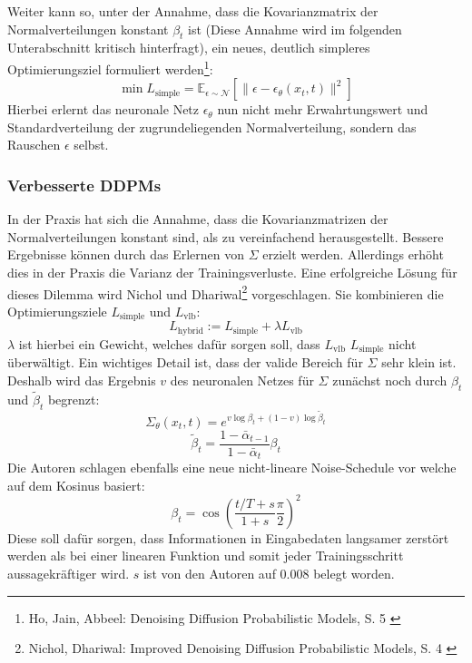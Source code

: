 Weiter kann so, unter der Annahme, dass die Kovarianzmatrix der Normalverteilungen konstant $\beta_t$ ist (Diese Annahme wird im folgenden Unterabschnitt kritisch hinterfragt), ein neues, deutlich simpleres Optimierungsziel formuliert werden\footnote{
    Ho, Jain, Abbeel: Denoising Diffusion Probabilistic Models, S. 5
    \cite{ho2020denoisingdiffusionprobabilisticmodels}
}: 
\begin{equation}
    \min L_\text{simple} = \mathbb E_{\epsilon \sim \mathcal N}
    \left [
        \| \epsilon - \epsilon_\theta(x_{t}, t) \|^2
    \right ]
\end{equation}
Hierbei erlernt das neuronale Netz $\epsilon_\theta$ nun nicht mehr Erwahrtungswert und Standardverteilung der zugrundeliegenden Normalverteilung, sondern das Rauschen $\epsilon$ selbst. 

\subsubsection{Verbesserte DDPMs}

In der Praxis hat sich die Annahme, dass die Kovarianzmatrizen der Normalverteilungen konstant sind, als zu vereinfachend herausgestellt. Bessere Ergebnisse können durch das Erlernen von $\Sigma$ erzielt werden. Allerdings erhöht dies in der Praxis die Varianz der Trainingsverluste. Eine erfolgreiche Lösung für dieses Dilemma wird Nichol und Dhariwal\footnote{
    Nichol, Dhariwal: Improved Denoising Diffusion Probabilistic Models, S. 4
    \cite{nichol2021improveddenoisingdiffusionprobabilistic}
} vorgeschlagen. Sie kombinieren die Optimierungsziele $L_\text{simple}$ und $L_\text{vlb}$:
\begin{equation}
    L_\text{hybrid} := L_\text{simple} + \lambda L_\text{vlb}
\end{equation}
$\lambda$ ist hierbei ein Gewicht, welches dafür sorgen soll, dass $L_\text{vlb}$ $L_\text{simple}$ nicht überwältigt. Ein wichtiges Detail ist, dass der valide Bereich für $\Sigma$ sehr klein ist. Deshalb wird das Ergebnis $v$ des neuronalen Netzes für $\Sigma$ zunächst noch durch $\beta_t$ und $\tilde \beta_t$ begrenzt:
\begin{equation}
    \Sigma_\theta(x_t, t) = e^{v \log \beta_t + (1 - v) \log \tilde \beta_t}
\end{equation}
\begin{equation}
    \tilde \beta_t = \frac{1-\bar \alpha_{t-1}} {1-\bar \alpha_{t}} \beta_t
\end{equation}
Die Autoren schlagen ebenfalls eine neue nicht-lineare Noise-Schedule vor welche auf dem Kosinus basiert: 
\begin{equation}
    \beta_t = \cos \left ( 
        \frac{t/T+s}{1+s} \frac{\pi}{2}
    \right )^2
\end{equation}
Diese soll dafür sorgen, dass Informationen in Eingabedaten langsamer zerstört werden als bei einer linearen Funktion und somit jeder Trainingsschritt aussagekräftiger wird. $s$ ist von den Autoren auf 0.008 belegt worden.

